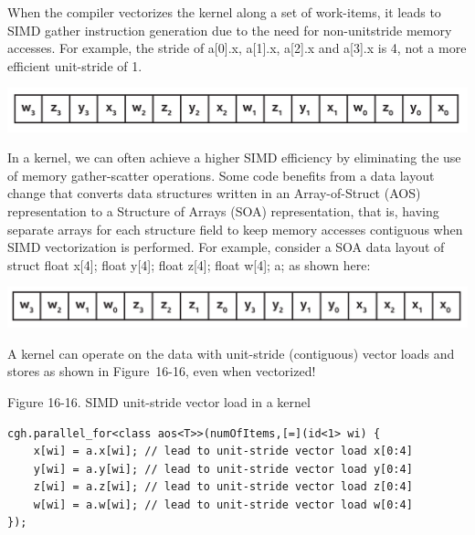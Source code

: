 When the compiler vectorizes the kernel along a set of work-items, it leads to SIMD gather instruction generation due to the need for non-unitstride memory accesses. For example, the stride of a[0].x, a[1].x, a[2].x and a[3].x is 4, not a more efficient unit-stride of 1.\par

\begin{center}
	\includegraphics[width=1.0\textwidth]{content/chapter-16/images/8}
\end{center}

In a kernel, we can often achieve a higher SIMD efficiency by eliminating the use of memory gather-scatter operations. Some code benefits from a data layout change that converts data structures written in an Array-of-Struct (AOS) representation to a Structure of Arrays (SOA) representation, that is, having separate arrays for each structure field to keep memory accesses contiguous when SIMD vectorization is performed. For example, consider a SOA data layout of struct {float x[4]; float 	y[4]; float z[4]; float w[4];} a; as shown here:\par

\begin{center}
	\includegraphics[width=1.0\textwidth]{content/chapter-16/images/9}
\end{center}

A kernel can operate on the data with unit-stride (contiguous) vector loads and stores as shown in Figure 16-16, even when vectorized!

\hspace*{\fill} \par %
Figure 16-16. SIMD unit-stride vector load in a kernel
\begin{lstlisting}[caption={}]
cgh.parallel_for<class aos<T>>(numOfItems,[=](id<1> wi) {
	x[wi] = a.x[wi]; // lead to unit-stride vector load x[0:4]
	y[wi] = a.y[wi]; // lead to unit-stride vector load y[0:4]
	z[wi] = a.z[wi]; // lead to unit-stride vector load z[0:4]
	w[wi] = a.w[wi]; // lead to unit-stride vector load w[0:4]
});
\end{lstlisting}

